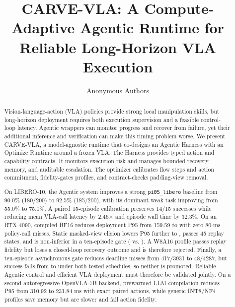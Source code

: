 \documentclass[runningheads]{waica}
\newcommand{\method}{CARVE-VLA}
\begin{document}
\title{CARVE-VLA: A Compute-Adaptive Agentic Runtime for Reliable Long-Horizon VLA Execution}

\author{Anonymous Authors}

\maketitle

\begin{abstract}
Vision-language-action (VLA) policies provide strong local manipulation skills,
but long-horizon deployment requires both execution supervision and a feasible
control-loop latency. Agentic wrappers can monitor progress and recover from
failure, yet their additional inference and verification can make this timing
problem worse. We present \method{}, a model-agnostic runtime that co-designs
an Agentic Harness with an
Optimize Runtime around a frozen VLA. The Harness provides typed action and
capability contracts. It monitors execution risk and manages bounded recovery,
memory, and auditable escalation. The optimizer calibrates flow steps and action
commitment, fidelity-gates profiles, and contract-checks padding-view removal.

On LIBERO-10, the Agentic system improves a strong \texttt{pi05\_libero}
baseline from 90.0\% (180/200) to 92.5\% (185/200), with its dominant weak task
improving from 55.0\% to 75.0\%. A paired 15-episode calibration preserves
14/15 successes while reducing mean VLA-call latency by 2.46$\times$ and
episode wall time by 32.3\%. On an RTX 4090, compiled BF16 reduces deployment
P95 from 159.59 to \CarveCompiledPninetyfive{} with zero 80-ms policy-call
misses. Static masked-view elision lowers P95 further to
\CarveSmvePninetyfive{}, passes 45 replay states, and is non-inferior in a
ten-episode gate (\CarveSmveSuccess{} vs. \CarveSyncEightSuccess{}). A W8A16 profile passes replay fidelity but loses a
closed-loop recovery outcome and is therefore rejected. Finally, a ten-episode
asynchronous gate reduces deadline misses from 417/3931 to 48/4287, but
success falls from \CarveSyncEightSuccess{} to \CarveAsyncSuccess{} under both
tested schedules, so neither is promoted. Reliable Agentic control and
efficient VLA deployment must therefore be validated jointly.
On a second autoregressive OpenVLA-7B backend, prewarmed LLM compilation
reduces P95 from 310.92 to 231.84 ms with exact paired actions, while generic
INT8/NF4 profiles save memory but are slower and fail action fidelity.

\end{abstract}
\end{document}

